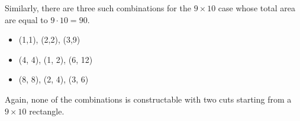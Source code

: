 \begin{solution}
Similarly, there are three such combinations for the $9 \times 10$ case whose total area are equal to $9\cdot 10=90$.
\begin{itemize}
	\item (1,1), (2,2), (3,9)
	\item (4, 4), (1, 2), (6, 12)
	\item (8, 8), (2, 4), (3, 6)
\end{itemize}
Again, none of the combinations is constructable with two cuts starting from a $9 \times 10$ rectangle.

\end{solution}